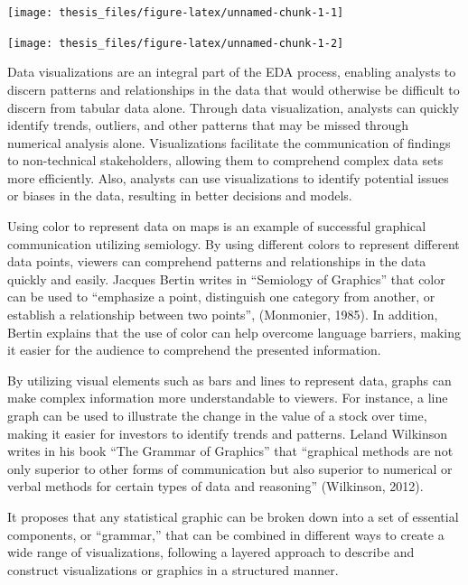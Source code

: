 \documentclass[print]{nuthesis}
\begin{document}
\begin{center}\texttt{[image: thesis\_files/figure-latex/unnamed-chunk-1-1]} \end{center}

\begin{center}\texttt{[image: thesis\_files/figure-latex/unnamed-chunk-1-2]} \end{center}

Data visualizations are an integral part of the EDA process, enabling analysts to discern patterns and relationships in the data that would otherwise be difficult to discern from tabular data alone.
Through data visualization, analysts can quickly identify trends, outliers, and other patterns that may be missed through numerical analysis alone.
Visualizations facilitate the communication of findings to non-technical stakeholders, allowing them to comprehend complex data sets more efficiently.
Also, analysts can use visualizations to identify potential issues or biases in the data, resulting in better decisions and models.

Using color to represent data on maps is an example of successful graphical communication utilizing semiology.
By using different colors to represent different data points, viewers can comprehend patterns and relationships in the data quickly and easily.
Jacques Bertin writes in ``Semiology of Graphics'' that color can be used to ``emphasize a point, distinguish one category from another, or establish a relationship between two points'', (Monmonier, 1985).
In addition, Bertin explains that the use of color can help overcome language barriers, making it easier for the audience to comprehend the presented information.

By utilizing visual elements such as bars and lines to represent data, graphs can make complex information more understandable to viewers.
For instance, a line graph can be used to illustrate the change in the value of a stock over time, making it easier for investors to identify trends and patterns.
Leland Wilkinson writes in his book ``The Grammar of Graphics'' that ``graphical methods are not only superior to other forms of communication but also superior to numerical or verbal methods for certain types of data and reasoning'' (Wilkinson, 2012).

It proposes that any statistical graphic can be broken down into a set of essential components, or ``grammar,'' that can be combined in different ways to create a wide range of visualizations, following a layered approach to describe and construct visualizations or graphics in a structured manner.
\end{document}
